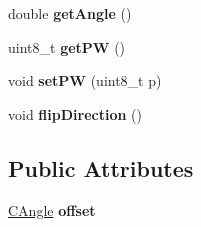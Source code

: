 \begin{DoxyCompactItemize}
\item 
\hypertarget{class_c_servo2_acafd038ae22d86206786c6cb1f5765a6}{
double {\bfseries getAngle} ()}
\label{class_c_servo2_acafd038ae22d86206786c6cb1f5765a6}

\item 
\hypertarget{class_c_servo2_a27d22533a3869156275a5e50c94bdf19}{
uint8\_\-t {\bfseries getPW} ()}
\label{class_c_servo2_a27d22533a3869156275a5e50c94bdf19}

\item 
\hypertarget{class_c_servo2_ad675a0e5812a03ed6bad7fa102bae073}{
void {\bfseries setPW} (uint8\_\-t p)}
\label{class_c_servo2_ad675a0e5812a03ed6bad7fa102bae073}

\item 
\hypertarget{class_c_servo2_aadaa9839321568024a178721dfc360e2}{
void {\bfseries flipDirection} ()}
\label{class_c_servo2_aadaa9839321568024a178721dfc360e2}

\end{DoxyCompactItemize}
\subsection*{Public Attributes}
\begin{DoxyCompactItemize}
\item 
\hypertarget{class_c_servo2_a1ddc2df94150af0f2ad56e712854bfb4}{
\hyperlink{class_c_angle}{CAngle} {\bfseries offset}}
\label{class_c_servo2_a1ddc2df94150af0f2ad56e712854bfb4}

\end{DoxyCompactItemize}
